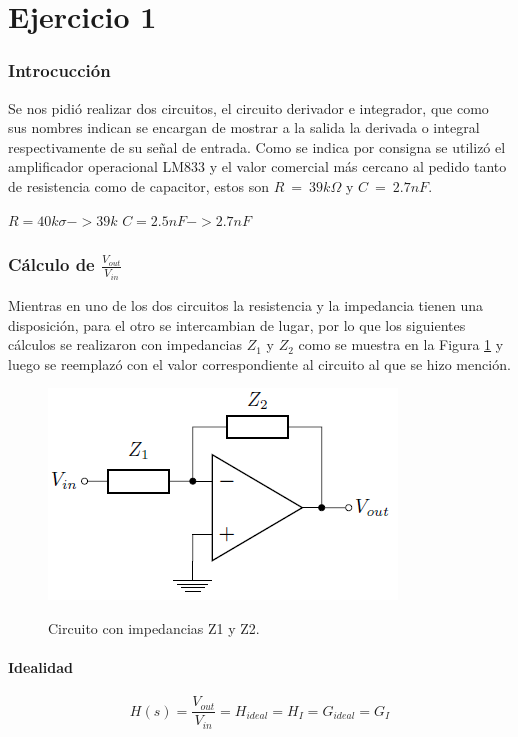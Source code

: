 \documentclass[11pt, a4paper]{article}
\begin{document}
\part{Ejercicio 1}
\section{Introcucción}
	Se nos pidió realizar dos circuitos, el circuito derivador e integrador, que como sus nombres indican se encargan de mostrar a la salida la derivada  o integral respectivamente de su señal de entrada.
	Como se indica por consigna se utilizó el amplificador operacional LM833 y el valor comercial más cercano al pedido tanto de resistencia como de capacitor, estos son $R \ = \ 39k \Omega$ y $C \ = \ 2.7 nF$.

$R=40k\sigma -> 39k$
$C = 2.5 nF -> 2.7 nF$
\section{Cálculo de $\frac{V_{out}}{V_{in}}$}
Mientras en uno de los dos circuitos la resistencia y la impedancia tienen una disposición, para el otro se intercambian de lugar, por lo que los siguientes cálculos se realizaron con impedancias $Z_1$ y $Z_2 $ como se muestra en la Figura \ref{circconz1z2} y luego se reemplazó con el valor correspondiente al circuito al que se hizo mención.

\begin{figure}[h!]
\centering
\includegraphics[scale=0.5]{circconz1z2.png}
\label{circconz1z2}
\caption{Circuito con impedancias Z1 y Z2.}
\end{figure}


\subsection{Idealidad}
\begin{equation}
	H(s) = \dfrac{V_{out}}{V_{in}} = H_{ideal} = H_I= G_{ideal} = G_I 
\end{equation}
\end{document}
